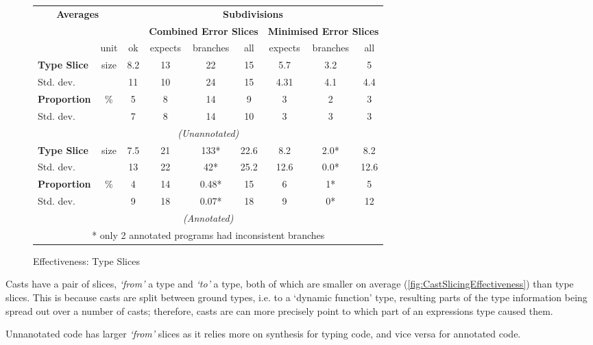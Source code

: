 \begin{figure}[h]
  \centering
  \begin{tabular}{lc|c|ccc|ccc}
  \multicolumn{2}{c}{\textbf{Averages}} & \multicolumn{7}{c}{\textbf{Subdivisions}}\\
  & & & \multicolumn{3}{c|}{\textbf{Combined Error Slices}} & \multicolumn{3}{c}{\textbf{Minimised Error Slices}}\\ 
   & unit & ok & expects & branches & all & expects & branches & all\\
   \hline
   \textbf{Type Slice} & size &  8.2 & 13 & 22 & 15&  5.7 & 3.2 & 5 \\
   Std. dev. &  				 &  11 & 10 & 24 & 15&    4.31 & 4.1 & 4.4 \\
   \textbf{Proportion}& \%    & 5 & 8 & 14 & 9&        3  & 2 & 3 \\
   Std. dev. &  				 &  7 & 8 & 14 & 10&      3 & 3 & 3 \\
   \multicolumn{9}{c}{\textit{(Unannotated)}}\\
   \textbf{Type Slice} & size &  7.5 & 21 & 133* & 22.6 &8.2&  2.0* & 8.2  \\
   Std. dev. 			&    &  13 & 22 & 42* & 25.2& 12.6&  0.0* & 12.6  \\
   \textbf{Proportion}& \% 	 & 4 & 14 & 0.48* & 15&  6&    1* & 5  \\
   Std. dev. &  				 &  9 & 18 & 0.07* & 18&   9&    0* & 12  \\
   \multicolumn{9}{c}{\textit{(Annotated)}}\\
   \multicolumn{9}{c}{* only 2 annotated programs had inconsistent branches}
  \end{tabular}
  \caption{Effectiveness: Type Slices}
\label{fig:TypeSlicingEffectiveness}
\end{figure}
Casts have a pair of slices, \textit{`from'} a type and \textit{`to'} a type, both of which are smaller on average (\cref{fig:CastSlicingEffectiveness}) than type slices. This is because casts are split between ground types, i.e. to a `dynamic function' type, resulting parts of the type information being spread out over a number of casts; therefore, casts are can more precisely point to which part of an expressions type caused them.

Unnanotated code has larger \textit{`from'} slices as it relies more on synthesis for typing code, and vice versa for annotated code.



